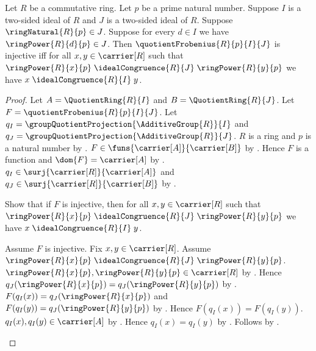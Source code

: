 \begin{theorem}\label{quotient_frobenius_injective_iff_congruence_reflection}
    Let $R$ be a commutative ring.
    Let $p$ be a prime natural number.
    Suppose $I$ is a two-sided ideal of $R$ and
        $J$ is a two-sided ideal of $R$.
    Suppose $\ringNatural{R}{p}\in J$.
    Suppose for every $d\in I$ we have
        $\ringPower{R}{d}{p}\in J$.
    Then $\quotientFrobenius{R}{p}{I}{J}$ is injective iff
        for all $x,y\in\carrier[R]$ such that
            $\ringPower{R}{x}{p}
                \mathrel{\idealCongruence{R}{J}}
            \ringPower{R}{y}{p}$ we have
                $x\mathrel{\idealCongruence{R}{I}}y$.
\end{theorem}
\begin{proof}
    Let $A=\QuotientRing{R}{I}$ and $B=\QuotientRing{R}{J}$.
    Let $F=\quotientFrobenius{R}{p}{I}{J}$.
    Let $q_I=\groupQuotientProjection{\AdditiveGroup{R}}{I}$ and
        $q_J=\groupQuotientProjection{\AdditiveGroup{R}}{J}$.
    $R$ is a ring and $p$ is a natural number by
        .
    $F\in\funs{\carrier[A]}{\carrier[B]}$ by
        .
    Hence $F$ is a function and $\dom{F}=\carrier[A]$ by
        .
    $q_I\in\surj{\carrier[R]}{\carrier[A]}$ and
        $q_J\in\surj{\carrier[R]}{\carrier[B]}$ by
        .

    Show that if $F$ is injective, then for all
        $x,y\in\carrier[R]$ such that
            $\ringPower{R}{x}{p}
                \mathrel{\idealCongruence{R}{J}}
            \ringPower{R}{y}{p}$ we have
                $x\mathrel{\idealCongruence{R}{I}}y$.
    \begin{subproof}
        Assume $F$ is injective.
        Fix $x,y\in\carrier[R]$.
        Assume
            $\ringPower{R}{x}{p}
                \mathrel{\idealCongruence{R}{J}}
            \ringPower{R}{y}{p}$.
        $\ringPower{R}{x}{p},\ringPower{R}{y}{p}\in\carrier[R]$ by
            .
        Hence
            $q_J(\ringPower{R}{x}{p})
                =q_J(\ringPower{R}{y}{p})$ by
            .
        $F(q_I(x))=q_J(\ringPower{R}{x}{p})$ and
            $F(q_I(y))=q_J(\ringPower{R}{y}{p})$ by
            .
        Hence $F(q_I(x))=F(q_I(y))$.
        $q_I(x),q_I(y)\in\carrier[A]$ by
            .
        Hence $q_I(x)=q_I(y)$ by .
        Follows by
            .
    \end{subproof}


\end{proof}
